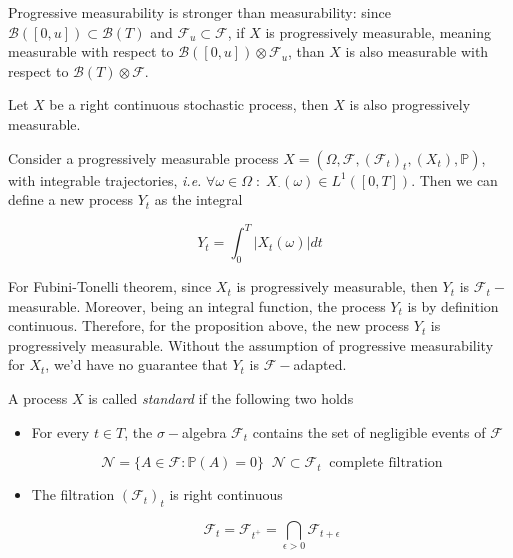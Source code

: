 Progressive measurability is stronger than measurability: since $\mathcal{B}([0,u]) \subset \mathcal{B}(T)$ and $\mathcal{F}_u \subset \mathcal{F}$, if $X$ is progressively measurable, meaning measurable with respect to $\mathcal{B}([0,u]) \otimes \mathcal{F}_u$, than $X$ is also measurable with respect to $\mathcal{B}(T) \otimes \mathcal{F}$.

\begin{proposition}
    Let $X$ be a right continuous stochastic process, then $X$ is also progressively measurable. 
\end{proposition}

Consider a progressively measurable process $X = (\Omega, \mathcal{F}, (\mathcal{F}_t)_t, (X_t), \mathbb{P})$, with integrable trajectories, \textit{i.e.} $\forall \omega \in \Omega \; : \; X_{\cdot}(\omega) \in L^1([0,T])$. Then we can define a new process $Y_t$ as the integral 

\begin{equation*}
    Y_t = \int_0^T \big\vert X_t(\omega) \big\vert dt 
\end{equation*}

For Fubini-Tonelli theorem, since $X_t$ is progressively measurable, then $Y_t$ is $\mathcal{F}_t-$measurable. Moreover, being an integral function, the process $Y_t$ is by definition continuous. Therefore, for the proposition above, the new process $Y_t$ is progressively measurable. Without the assumption of progressive measurability for $X_t$, we'd have no guarantee that $Y_t$ is $\mathcal{F}-$adapted. 

\begin{definition}
    A process $X$ is called \textit{standard} if the following two holds
    \begin{itemize}
        \item For every $t \in T$, the $\sigma-$algebra $\mathcal{F}_t$ contains the set of negligible events of $\mathcal{F}$

        \begin{equation*}
            \mathcal{N} = \Big\{ A \in \mathcal{F} : \mathbb{P}(A) = 0 \Big\} \;\; \mathcal{N} \subset \mathcal{F}_t \;\; \text{complete filtration}
        \end{equation*}

        \item The filtration $(\mathcal{F}_t)_t$ is right continuous

        \begin{equation*}
            \mathcal{F}_t = \mathcal{F}_{t^+} = \bigcap_{\epsilon > 0} \mathcal{F}_{t+\epsilon}
        \end{equation*}
    \end{itemize}
\end{definition}

